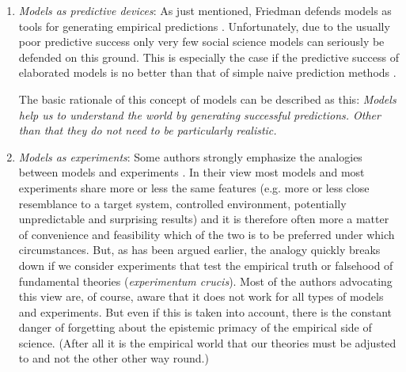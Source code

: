 \documentclass[onecollarge]{STJour}
\numberwithin{equation}{section}
\begin{document}
\begin{enumerate}

  \item {\em Models as predictive devices}: As just mentioned, Friedman
  defends models as tools for generating empirical predictions
  \citep[]{friedman:1953}. Unfortunately, due to the usually poor
  predictive success only very few social science models can seriously be
  defended on this ground. This is especially the case if the predictive
  success of elaborated models is no better than that of simple naive
  prediction methods \citep[ch. 2/3]{betz:2006}.
  
  The basic rationale of this concept of models can be described as
  this: {\em Models help us to understand the world by generating successful
   predictions. Other than that they do not need to be particularly
   realistic.}
  

  \item {\em Models as experiments}: Some authors strongly emphasize the
  analogies between models and experiments \citep{morrison:2009,
  maeki:2005}. In their view most models and most experiments share more
  or less the same features (e.g. more or less close resemblance to a
  target system, controlled environment, potentially unpredictable and
  surprising results) and it is therefore often more a matter of
  convenience and feasibility which of the two is to be preferred under
  which circumstances. But, as has been argued earlier, the analogy
  quickly breaks down if we consider experiments that test the empirical
  truth or falsehood of fundamental theories ({\em experimentum
  crucis}). Most of the authors advocating this view are, of course,
  aware that it does not work for all types of models and experiments.
  But even if this is taken into account, there is the constant danger
  of forgetting about the epistemic primacy of the empirical side of
  science. (After all it is the empirical world that our theories must
  be adjusted to and not the other other way round.)
 

\end{enumerate}
\end{document}
